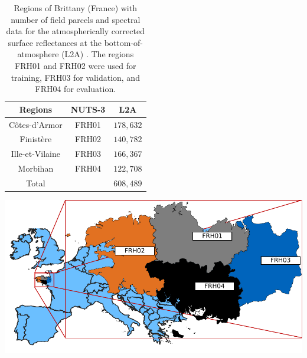 \documentclass[journal,article,submit,pdftex,moreauthors]{Definitions/mdpi}
\begin{document}
\begin{table}[H]
	\caption{Regions of Brittany (France) with number of field parcels and spectral data for the atmospherically corrected surface reflectances at the bottom-of-atmosphere (L2A) \cite{Russwurm2020}. The regions FRH01 and FRH02 were used for training, FRH03 for validation, and FRH04 for evaluation.}
	\begin{minipage}[b]{.4\linewidth}
		\small
		\begin{tabular}{c  c  c} 
			\hline
			Regions     & NUTS-3 & L2A \\ [1ex] 
			\hline
			Côtes-d'Armor   & FRH01  & $178,632$ \\ [1ex]
			Finistère       & FRH02  & $140,782$ \\ [1ex]
			Ille-et-Vilaine & FRH03  & $166,367$ \\ [1ex]
			Morbihan		& FRH04  & $122,708$ \\ [1ex] 
			\hline
			Total			&		 & $608,489$ \\ [1ex] 
			\hline
		\end{tabular}
		\label{Regions}
	\end{minipage}
	\begin{minipage}[b]{.5\linewidth}
		\centering
		\includegraphics[width=0.9\linewidth]{figures/breizhCrops_regions_black.pdf}
	  \end{minipage}
\end{table}
\end{document}
